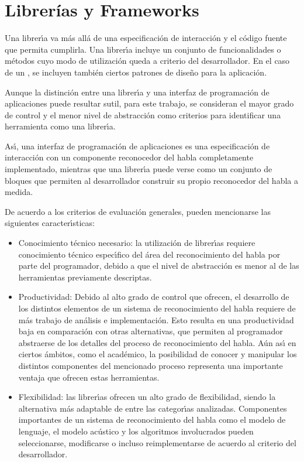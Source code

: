 \section{Librer\'ias y Frameworks}
\label{sec:librerias}

Una librer{\'\i}a va m\'as all\'a de una especificaci\'on de interacci\'on y el c\'odigo fuente que permita cumplirla.
Una librer{\'\i}a incluye un conjunto de funcionalidades o m\'etodos cuyo modo de utilizaci\'on queda a criterio
del desarrollador. En el caso de un , se incluyen tambi\'en ciertos patrones de dise\~no para la aplicaci\'on.

Aunque la distinci\'on entre una librer{\'\i}a y una interfaz de programaci\'on de aplicaciones puede resultar
sutil, para este trabajo, se consideran el mayor grado de control y el menor nivel de abstracci\'on
como criterios para identificar una herramienta como una librer{\'\i}a.

As{\'\i}, una interfaz de programaci\'on de aplicaciones es una especificaci\'on de interacci\'on con un componente
reconocedor del habla completamente implementado, mientras que una librer{\'\i}a puede verse como un conjunto
de bloques que permiten al desarrollador construir su propio reconocedor del habla a medida.

De acuerdo a los criterios de evaluaci\'on generales, pueden mencionarse las 
siguientes caracter{\'\i}sticas:

\begin{itemize}
 	\item Conocimiento t\'ecnico necesario: la utilizaci\'on de librer{\'\i}as requiere conocimiento t\'ecnico
 	espec{\'\i}fico del \'area del reconocimiento del habla por parte del programador, debido a que el nivel de
 	abstracci\'on es menor al de las herramientas previamente descriptas.
 	\item Productividad: Debido al alto grado de control que ofrecen, el desarrollo de los distintos
 	elementos de un sistema de reconocimiento del habla requiere de m\'as trabajo de an\'alisis e implementaci\'on.
 	Esto resulta en una productividad baja en comparaci\'on con otras alternativas, que permiten al
 	programador abstraerse de los detalles del proceso de reconocimiento del habla.
 	A\'un as{\'\i} en ciertos \'ambitos, como el acad\'emico, la posibilidad de conocer y manipular los distintos
 	componentes del mencionado proceso representa una importante ventaja que ofrecen estas herramientas.
 	\item Flexibilidad: las librer{\'\i}as ofrecen un alto grado de flexibilidad, siendo la alternativa
 	m\'as adaptable de entre las categor{\'\i}as analizadas. Componentes importantes de un sistema
 	de reconocimiento del habla como el modelo de lenguaje, el modelo ac\'ustico y los algoritmos involucrados
 	pueden seleccionarse, modificarse o incluso reimplementarse de acuerdo al criterio del desarrollador.
 \end{itemize}

